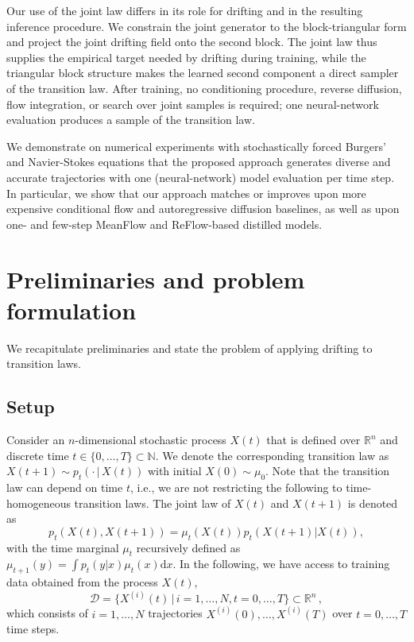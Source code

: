 \documentclass[oneside,11pt]{article}
\theoremstyle{remark}
\begin{document}
Our use of the joint law differs in its role for drifting and in the resulting inference procedure. We constrain the joint generator to the block-triangular form and project the joint drifting field onto the second block. The joint law thus supplies the empirical target needed by drifting during training, while the triangular block structure makes the learned second component a direct sampler of the transition law. After training, no conditioning procedure, reverse diffusion, flow integration, or search over joint samples is required; one neural-network evaluation produces a sample of the transition law.



We demonstrate on numerical experiments with stochastically forced Burgers' and Navier-Stokes equations that the proposed approach generates diverse and accurate trajectories with one (neural-network) model evaluation per time step. In particular, we show that our approach matches or improves upon more expensive conditional flow and autoregressive diffusion baselines, as well as upon one- and few-step MeanFlow and ReFlow-based distilled models.


\section{Preliminaries and problem formulation}
We recapitulate preliminaries and state the problem of applying drifting to transition laws.

\subsection{Setup}
Consider an $n$-dimensional stochastic process $X(t)$ that is defined over $\mathbb{R}^n$ and  discrete time $t \in \{0, \dots, T\} \subset \mathbb{N}$. 
We denote the corresponding transition law as $X(t + 1) \sim p_t(\cdot \,|\, X(t))$ with initial $X(0) \sim \mu_0$. Note that the transition law can depend on time $t$, i.e., we are not restricting the following to time-homogeneous transition laws.
The joint law of $X(t)$ and $X(t + 1)$ is denoted as  
\[
p_t(X(t), X(t + 1)) = \mu_t(X(t))p_t(X(t + 1) | X(t)),
\]
with the time marginal $\mu_t$ recursively defined as $\mu_{t+1}(y) = \int p_t(y | x) \mu_{t}(x)\mathrm dx$.
In the following, we have access to training data obtained from the process $X(t)$,
\begin{equation}\label{eq:data}
\mathcal{D} = \{X^{(i)}(t) \,|\, i = 1, \dots, N, t = 0, \dots, T\} \subset \mathbb{R}^n\,, 
\end{equation}
which consists of $i = 1, \dots, N$ trajectories $X^{(i)}(0), \dots, X^{(i)}(T)$ over $t = 0, \dots, T$ time steps.
\end{document}
